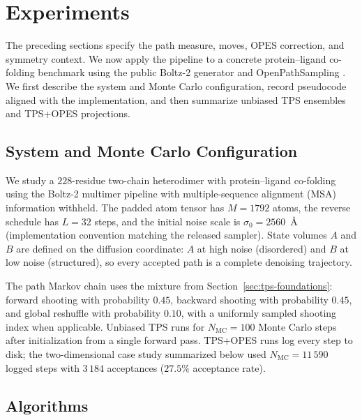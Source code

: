\section{Experiments}
\label{sec:experiments}

The preceding sections specify the path measure, moves, OPES correction, and
symmetry context. We now apply the pipeline to a concrete protein--ligand
co-folding benchmark using the public Boltz-2 generator and OpenPathSampling
\citep{ops}. We first describe the system and Monte Carlo configuration, record
pseudocode aligned with the implementation, and then summarize unbiased TPS ensembles and TPS+OPES projections.

\subsection{System and Monte Carlo Configuration}

We study a $228$-residue two-chain heterodimer with protein--ligand co-folding
using the Boltz-2 multimer pipeline with multiple-sequence alignment (MSA)
information withheld. The padded atom tensor has $M = 1792$ atoms, the reverse
schedule has $L = 32$ steps, and the initial noise scale is
$\sigma_0 = 2560$~\AA{} (implementation convention matching the released
sampler). State volumes $A$ and $B$ are defined on the diffusion coordinate:
$A$ at high noise (disordered) and $B$ at low noise (structured), so every
accepted path is a complete denoising trajectory.

The path Markov chain uses the mixture from Section~\ref{sec:tps-foundations}:
forward shooting with probability $0.45$, backward shooting with probability
$0.45$, and global reshuffle with probability $0.10$, with a uniformly sampled
shooting index when applicable. Unbiased TPS runs for $N_{\mathrm{MC}} = 100$
Monte Carlo steps after initialization from a single forward pass. TPS+OPES
runs log every step to disk; the two-dimensional case study summarized below
used $N_{\mathrm{MC}} = 11\,590$ logged steps with $3\,184$ acceptances
($27.5\%$ acceptance rate).

\subsection{Algorithms}

